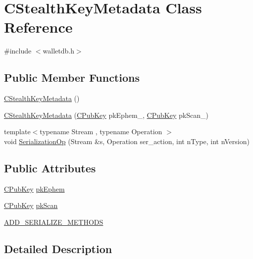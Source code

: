 \hypertarget{class_c_stealth_key_metadata}{}\section{C\+Stealth\+Key\+Metadata Class Reference}
\label{class_c_stealth_key_metadata}


{\ttfamily \#include $<$walletdb.\+h$>$}

\subsection*{Public Member Functions}
\begin{DoxyCompactItemize}
\item 
\hyperlink{class_c_stealth_key_metadata_afaab6f89c2fd3644080e997b5d4b7c42}{C\+Stealth\+Key\+Metadata} ()
\item 
\hyperlink{class_c_stealth_key_metadata_a0dbf3cce45146537ebadc98d04e41a46}{C\+Stealth\+Key\+Metadata} (\hyperlink{class_c_pub_key}{C\+Pub\+Key} pk\+Ephem\+\_\+, \hyperlink{class_c_pub_key}{C\+Pub\+Key} pk\+Scan\+\_\+)
\item 
{\footnotesize template$<$typename Stream , typename Operation $>$ }\\void \hyperlink{class_c_stealth_key_metadata_a4aa4f82e29e709287100972b4790c6c2}{Serialization\+Op} (Stream \&s, Operation ser\+\_\+action, int n\+Type, int n\+Version)
\end{DoxyCompactItemize}
\subsection*{Public Attributes}
\begin{DoxyCompactItemize}
\item 
\hyperlink{class_c_pub_key}{C\+Pub\+Key} \hyperlink{class_c_stealth_key_metadata_a109d244f532a6de7401e71256732da8e}{pk\+Ephem}
\item 
\hyperlink{class_c_pub_key}{C\+Pub\+Key} \hyperlink{class_c_stealth_key_metadata_a0444523e7274793bd69269c08f6925db}{pk\+Scan}
\item 
\hyperlink{class_c_stealth_key_metadata_ae96c692529c691b24d1340802d8e0791}{A\+D\+D\+\_\+\+S\+E\+R\+I\+A\+L\+I\+Z\+E\+\_\+\+M\+E\+T\+H\+O\+D\+S}
\end{DoxyCompactItemize}


\subsection{Detailed Description}


